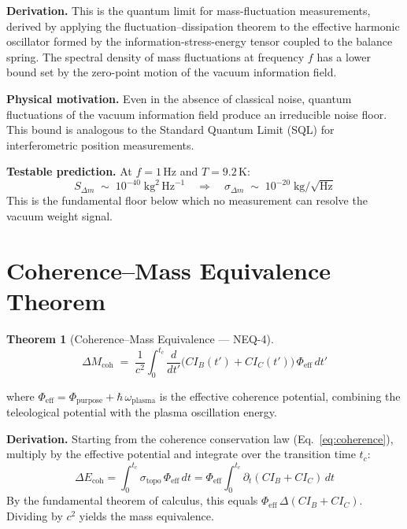 \documentclass[11pt,a4paper]{article}
\newtheorem{theorem}{Theorem}[section]
\theoremstyle{remark}
\begin{document}
\textbf{Derivation.}\quad
This is the quantum limit for mass-fluctuation measurements, derived by applying the fluctuation--dissipation theorem to the effective harmonic oscillator formed by the information-stress-energy tensor coupled to the balance spring.  The spectral density of mass fluctuations at frequency $f$ has a lower bound set by the zero-point motion of the vacuum information field.

\textbf{Physical motivation.}\quad
Even in the absence of classical noise, quantum fluctuations of the vacuum information field produce an irreducible noise floor.  This bound is analogous to the Standard Quantum Limit (SQL) for interferometric position measurements.

\textbf{Testable prediction.}\quad
At $f = 1$\,Hz and $T = 9.2$\,K:
\[
    S_{\Delta m} \;\sim\; 10^{-40}\;\text{kg}^2\,\text{Hz}^{-1}
    \quad\Longrightarrow\quad
    \sigma_{\Delta m} \;\sim\; 10^{-20}\;\text{kg}/\sqrt{\text{Hz}}
\]
This is the fundamental floor below which no measurement can resolve the vacuum weight signal.

\section{Coherence--Mass Equivalence Theorem}
\label{sec:novel4}

\begin{theorem}[Coherence--Mass Equivalence --- NEQ-4]
\begin{equation}\label{eq:novel4}
    \Delta M_{\text{coh}} \;=\; \frac{1}{c^2}\int_0^{t_c}\!
        \frac{d}{dt'}\!\bigl(CI_B(t') + CI_C(t')\bigr)\,
        \Phi_{\text{eff}}\, dt'
\end{equation}
\end{theorem}

where $\Phi_{\text{eff}} = \Phi_{\text{purpose}} + \hbar\,\omega_{\text{plasma}}$ is the effective coherence potential, combining the teleological potential with the plasma oscillation energy.

\textbf{Derivation.}\quad
Starting from the coherence conservation law (Eq.~\eqref{eq:coherence}), multiply by the effective potential and integrate over the transition time $t_c$:
\[
    \Delta E_{\text{coh}} = \int_0^{t_c} \sigma_{\text{topo}}\,\Phi_{\text{eff}}\, dt
    = \Phi_{\text{eff}}\int_0^{t_c} \partial_t(CI_B + CI_C)\, dt
\]
By the fundamental theorem of calculus, this equals $\Phi_{\text{eff}}\,\Delta(CI_B + CI_C)$.  Dividing by $c^2$ yields the mass equivalence.
\end{document}
